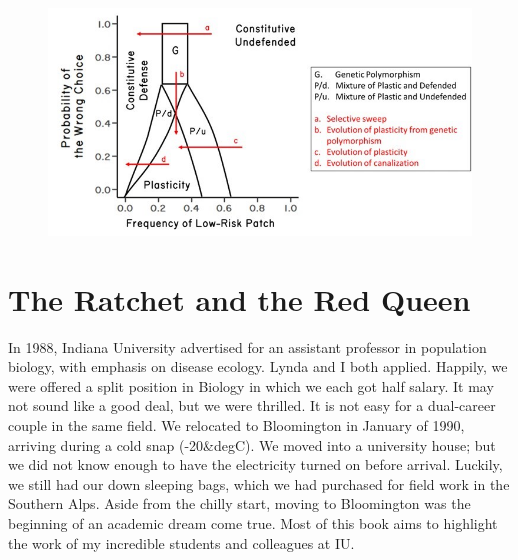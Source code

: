 \documentclass[
  letterpaper,
]{book}
\begin{document}
\begin{tcolorbox}
\begin{figure}[H]

{\centering \includegraphics{images/fig3-7.JPG}

}

\end{figure}

\end{tcolorbox}


\hypertarget{sec-chap6}{%
\chapter{The Ratchet and the Red Queen}\label{sec-chap6}}

In 1988, Indiana University advertised for an assistant professor in
population biology, with emphasis on disease ecology. Lynda and I both
applied. Happily, we were offered a split position in Biology in which
we each got half salary. It may not sound like a good deal, but we were
thrilled. It is not easy for a dual-career couple in the same field. We
relocated to Bloomington in January of 1990, arriving during a cold snap
(-20\&degC). We moved into a university house; but we did not know
enough to have the electricity turned on before arrival. Luckily, we
still had our down sleeping bags, which we had purchased for field work
in the Southern Alps. Aside from the chilly start, moving to Bloomington
was the beginning of an academic dream come true. Most of this book aims
to highlight the work of my incredible students and colleagues at IU.
\end{document}
